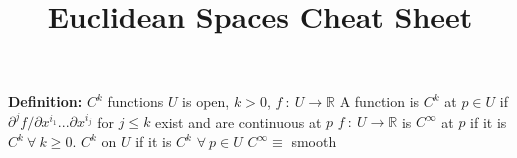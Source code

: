 \documentclass[14pt]{extarticle}
\title{Euclidean Spaces Cheat Sheet}
\def\Definition{{\color{blue} \textbf{Definition:} }}
\def\Theorem{{\color{red} \textbf{Theorem:} }}
\begin{document}
	\maketitle
	\begin{outline}	

		\1	\Definition $C^k$ functions
			\2	$U$ is open, $k > 0$, $f~:~U \rightarrow \mathbb{R}$
			\2	A function is $C^k$ at $p \in U$ if 
					$\partial^j f / \partial x^{i_1}... \partial x^{i_j}$ for $j \le k$
					exist and are continuous at $p$
					\3	$f~:~U \rightarrow \mathbb{R}$ is $C^{\infty}$ at $p$ if it
							is $C^k~\forall~k \ge 0$.
			\2	$C^k$ on $U$ if it is $C^k$ $\forall~p \in U$	
					\3	$C^{\infty} \equiv $ smooth

			\end{outline}
\end{document}
